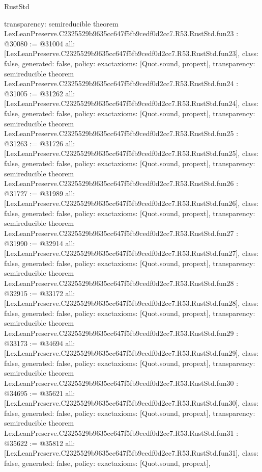 \begin{lexlean}{RustStd}
\begin{coremodule}
{  transparency: semireducible
}
theorem LexLeanPreserve.C2325529b9635cc647f5fb9cedf0d2cc7.R53.RustStd.fun23 : @30080 := @31004 {
  all: [LexLeanPreserve.C2325529b9635cc647f5fb9cedf0d2cc7.R53.RustStd.fun23],
  class: false,
  generated: false,
  policy: exact{axioms: [Quot.sound, propext]},
  transparency: semireducible
}
theorem LexLeanPreserve.C2325529b9635cc647f5fb9cedf0d2cc7.R53.RustStd.fun24 : @31005 := @31262 {
  all: [LexLeanPreserve.C2325529b9635cc647f5fb9cedf0d2cc7.R53.RustStd.fun24],
  class: false,
  generated: false,
  policy: exact{axioms: [Quot.sound, propext]},
  transparency: semireducible
}
theorem LexLeanPreserve.C2325529b9635cc647f5fb9cedf0d2cc7.R53.RustStd.fun25 : @31263 := @31726 {
  all: [LexLeanPreserve.C2325529b9635cc647f5fb9cedf0d2cc7.R53.RustStd.fun25],
  class: false,
  generated: false,
  policy: exact{axioms: [Quot.sound, propext]},
  transparency: semireducible
}
theorem LexLeanPreserve.C2325529b9635cc647f5fb9cedf0d2cc7.R53.RustStd.fun26 : @31727 := @31989 {
  all: [LexLeanPreserve.C2325529b9635cc647f5fb9cedf0d2cc7.R53.RustStd.fun26],
  class: false,
  generated: false,
  policy: exact{axioms: [Quot.sound, propext]},
  transparency: semireducible
}
theorem LexLeanPreserve.C2325529b9635cc647f5fb9cedf0d2cc7.R53.RustStd.fun27 : @31990 := @32914 {
  all: [LexLeanPreserve.C2325529b9635cc647f5fb9cedf0d2cc7.R53.RustStd.fun27],
  class: false,
  generated: false,
  policy: exact{axioms: [Quot.sound, propext]},
  transparency: semireducible
}
theorem LexLeanPreserve.C2325529b9635cc647f5fb9cedf0d2cc7.R53.RustStd.fun28 : @32915 := @33172 {
  all: [LexLeanPreserve.C2325529b9635cc647f5fb9cedf0d2cc7.R53.RustStd.fun28],
  class: false,
  generated: false,
  policy: exact{axioms: [Quot.sound, propext]},
  transparency: semireducible
}
theorem LexLeanPreserve.C2325529b9635cc647f5fb9cedf0d2cc7.R53.RustStd.fun29 : @33173 := @34694 {
  all: [LexLeanPreserve.C2325529b9635cc647f5fb9cedf0d2cc7.R53.RustStd.fun29],
  class: false,
  generated: false,
  policy: exact{axioms: [Quot.sound, propext]},
  transparency: semireducible
}
theorem LexLeanPreserve.C2325529b9635cc647f5fb9cedf0d2cc7.R53.RustStd.fun30 : @34695 := @35621 {
  all: [LexLeanPreserve.C2325529b9635cc647f5fb9cedf0d2cc7.R53.RustStd.fun30],
  class: false,
  generated: false,
  policy: exact{axioms: [Quot.sound, propext]},
  transparency: semireducible
}
theorem LexLeanPreserve.C2325529b9635cc647f5fb9cedf0d2cc7.R53.RustStd.fun31 : @35622 := @35812 {
  all: [LexLeanPreserve.C2325529b9635cc647f5fb9cedf0d2cc7.R53.RustStd.fun31],
  class: false,
  generated: false,
  policy: exact{axioms: [Quot.sound, propext]},
}
\end{coremodule}
\end{lexlean}
